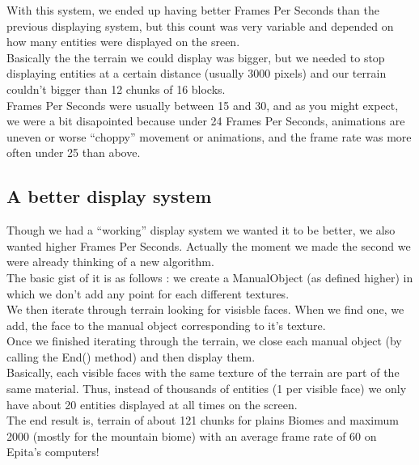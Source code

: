\documentclass[article]{report}         %
\begin{document}
        With this system, we ended up having better Frames Per Seconds than the previous displaying system, but this count was very variable and depended on how many entities were displayed on the sreen.\\
        
        Basically the the terrain we could display was bigger, but we needed to stop displaying entities at a certain distance (usually 3000 pixels) and our terrain couldn't bigger than 12 chunks of 16 blocks.\\

        Frames Per Seconds were usually between 15 and 30, and as you might expect, we were a bit disapointed because under 24 Frames Per Seconds, animations are uneven or worse ``choppy'' movement or animations, and the frame rate was more often under 25 than above.\\

        \subsection{A better display system}
          Though we had a ``working'' display system we wanted it to be better, we also wanted higher Frames Per Seconds. Actually the moment we made the second we were already thinking of a new algorithm.\\

          The basic gist of it is as follows : we create a ManualObject (as defined higher) in which we don't add any point for each different textures.\\
          We then iterate through terrain looking for visisble faces. When we find one, we add, the face to the manual object corresponding to it's texture.\\
          Once we finished iterating through the terrain, we close each manual object (by calling the End() method) and then display them.\\

          Basically, each visible faces with the same texture of the terrain are part of the same material. Thus, instead of thousands of entities (1 per visible face) we only have about 20 entities displayed at all times on the screen.\\

          The end result is, terrain of about 121 chunks for plains Biomes and maximum 2000 (mostly for the mountain biome) with an average frame rate of 60 on Epita's computers!\\
\end{document}
